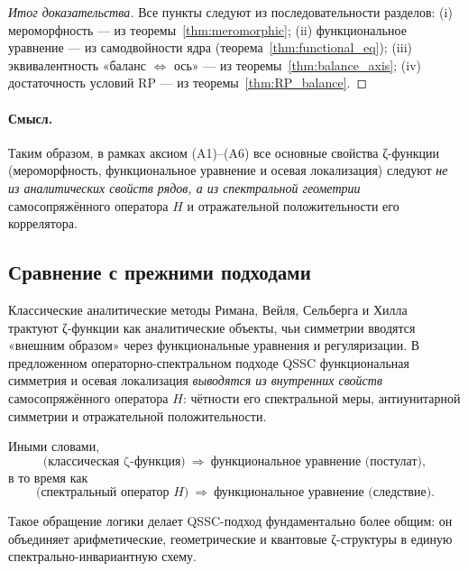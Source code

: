 \documentclass{article}
\numberwithin{equation}{section}
\theoremstyle{plain}
\theoremstyle{definition}
\theoremstyle{remark}
\def\Leftrightarrow{⇔}%
\begin{document}
\begin{proof}[Итог доказательства]
Все пункты следуют из последовательности разделов:
(i) мероморфность — из теоремы~\ref{thm:meromorphic};
(ii) функциональное уравнение — из самодвойности ядра (теорема~\ref{thm:functional_eq});
(iii) эквивалентность «баланс $\Leftrightarrow$ ось» —
из теоремы~\ref{thm:balance_axis};
(iv) достаточность условий RP — из теоремы~\ref{thm:RP_balance}.
\end{proof}

\paragraph{Смысл.}
Таким образом, в рамках аксиом (A1)–(A6)
все основные свойства ζ-функции (мероморфность, функциональное уравнение и осевая локализация)
следуют \emph{не из аналитических свойств рядов, а из спектральной геометрии}
самосопряжённого оператора $H$ и отражательной положительности его коррелятора.

\subsection{Сравнение с прежними подходами}
\label{subsec:comparison}

Классические аналитические методы Римана, Вейля, Сельберга и Хилла ~\cite{Selberg1956}
трактуют ζ-функции как аналитические объекты, чьи симметрии вводятся «внешним образом»
через функциональные уравнения и регуляризации.  
В предложенном операторно-спектральном подходе QSSC
функциональная симметрия и осевая локализация \emph{выводятся из внутренних свойств}
самосопряжённого оператора $H$:
чётности его спектральной меры, антиунитарной симметрии и отражательной положительности.

Иными словами,
\begin{equation}
\text{(классическая ζ-функция)}\ \Longrightarrow\ \text{функциональное уравнение (постулат)},
\label{eq:QSSC0037}
\end{equation}
в то время как
\begin{equation}
\text{(спектральный оператор $H$)}\ \Longrightarrow\ \text{функциональное уравнение (следствие)}.
\label{eq:QSSC0038}
\end{equation}

Такое обращение логики делает QSSC-подход фундаментально более общим:
он объединяет арифметические, геометрические и квантовые ζ-структуры
в единую спектрально-инвариантную схему.
\end{document}

